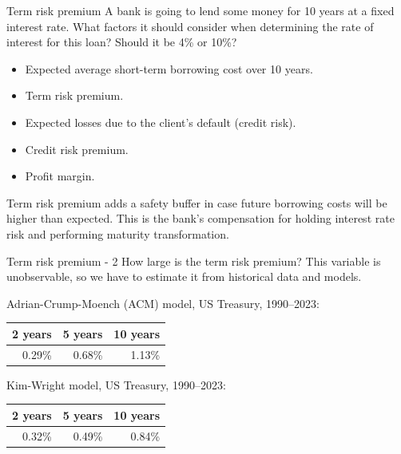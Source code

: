 \documentclass{beamer}
\begin{document}
\begin{frame}{Term risk premium}
\justify
A bank is going to lend some money for 10 years at a fixed interest rate. What factors it should consider when determining the rate of interest for this loan? Should it be 4\% or 10\%?

\begin{itemize}
\justifying
\item Expected average short-term borrowing cost over 10 years.
\item Term risk premium.
\item Expected losses due to the client's default (credit risk).
\item Credit risk premium.
\item Profit margin.
\end{itemize}

\justify
Term risk premium adds a safety buffer in case future borrowing costs will be higher than expected. This is the bank's compensation for holding interest rate risk and performing maturity transformation.
\end{frame}



\begin{frame}{Term risk premium - 2}
\justify
How large is the term risk premium? This variable is unobservable, so we have to estimate it from historical data and models.

\justify
 Adrian-Crump-Moench (ACM) model, US Treasury, 1990--2023:

\begin{tabular}{r|r|r}
2 years & 5 years & 10 years \\ \hline
0.29\% & 0.68\% & 1.13\% 
\end{tabular}

\justify
Kim-Wright model, US Treasury, 1990--2023:

\begin{tabular}{r|r|r}
2 years & 5 years & 10 years \\ \hline
0.32\% & 0.49\% & 0.84\%
\end{tabular}

\end{frame}
\end{document}

